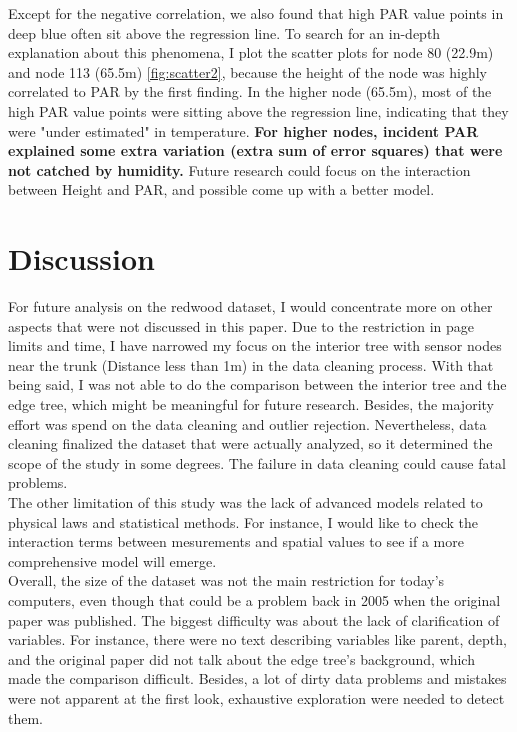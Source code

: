 \documentclass[11pt]{article}
\begin{document}
{Except for the negative correlation, we also found that high PAR value points in deep blue often sit above the regression line. To search for an in-depth explanation about this phenomena, I plot the scatter plots for node 80 (22.9m) and node 113 (65.5m) \ref{fig:scatter2}, because the height of the node was highly correlated to PAR by the first finding. In the higher node (65.5m), most of the high PAR value points were sitting above the regression line, indicating that they were "under estimated" in temperature. \textbf{For higher nodes, incident PAR explained some extra variation (extra sum of error squares) that were not catched by humidity.} Future research could focus on the interaction between Height and PAR, and possible come up with a better model.
\section{Discussion}
For future analysis on the redwood dataset, I would concentrate more on other aspects that were not discussed in this paper. Due to the restriction in page limits and time, I have narrowed my focus on the interior tree with sensor nodes near the trunk (Distance less than 1m) in the data cleaning process. With that being said, I was not able to do the comparison between the interior tree and the edge tree, which might be meaningful for future research. Besides, the majority effort was spend on the data cleaning and outlier rejection. Nevertheless, data cleaning finalized the dataset that were actually analyzed, so it determined the scope of the study in some degrees. The failure in data cleaning could cause fatal problems.\\
The other limitation of this study was the lack of advanced models related to physical laws and statistical methods. For instance, I would like to check the interaction terms between mesurements and spatial values to see if a more comprehensive model will emerge. \\
Overall, the size of the dataset was not the main restriction for today's computers, even though that could be a problem back in 2005 when the original paper was published. The biggest difficulty was about the lack of clarification of variables. For instance, there were no text describing variables like parent, depth, and the original paper did not talk about the edge tree's background, which made the comparison difficult. Besides, a lot of dirty data problems and mistakes were not apparent at the first look, exhaustive exploration were needed to detect them.

}
\end{document}
